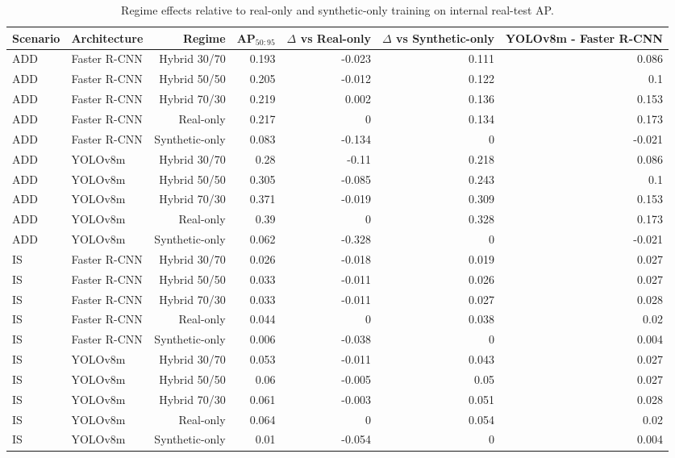 \begin{table}
\caption{Regime effects relative to real-only and synthetic-only training on internal real-test AP.}
\label{tab:effect_deltas}
\begin{tabular}{llrrrrr}
\toprule
Scenario & Architecture & Regime & AP$_{50:95}$ & $\Delta$ vs Real-only & $\Delta$ vs Synthetic-only & YOLOv8m - Faster R-CNN \\
\midrule
ADD & Faster R-CNN & Hybrid 30/70 & 0.193 & -0.023 & 0.111 & 0.086 \\
ADD & Faster R-CNN & Hybrid 50/50 & 0.205 & -0.012 & 0.122 & 0.1 \\
ADD & Faster R-CNN & Hybrid 70/30 & 0.219 & 0.002 & 0.136 & 0.153 \\
ADD & Faster R-CNN & Real-only & 0.217 & 0 & 0.134 & 0.173 \\
ADD & Faster R-CNN & Synthetic-only & 0.083 & -0.134 & 0 & -0.021 \\
ADD & YOLOv8m & Hybrid 30/70 & 0.28 & -0.11 & 0.218 & 0.086 \\
ADD & YOLOv8m & Hybrid 50/50 & 0.305 & -0.085 & 0.243 & 0.1 \\
ADD & YOLOv8m & Hybrid 70/30 & 0.371 & -0.019 & 0.309 & 0.153 \\
ADD & YOLOv8m & Real-only & 0.39 & 0 & 0.328 & 0.173 \\
ADD & YOLOv8m & Synthetic-only & 0.062 & -0.328 & 0 & -0.021 \\
IS & Faster R-CNN & Hybrid 30/70 & 0.026 & -0.018 & 0.019 & 0.027 \\
IS & Faster R-CNN & Hybrid 50/50 & 0.033 & -0.011 & 0.026 & 0.027 \\
IS & Faster R-CNN & Hybrid 70/30 & 0.033 & -0.011 & 0.027 & 0.028 \\
IS & Faster R-CNN & Real-only & 0.044 & 0 & 0.038 & 0.02 \\
IS & Faster R-CNN & Synthetic-only & 0.006 & -0.038 & 0 & 0.004 \\
IS & YOLOv8m & Hybrid 30/70 & 0.053 & -0.011 & 0.043 & 0.027 \\
IS & YOLOv8m & Hybrid 50/50 & 0.06 & -0.005 & 0.05 & 0.027 \\
IS & YOLOv8m & Hybrid 70/30 & 0.061 & -0.003 & 0.051 & 0.028 \\
IS & YOLOv8m & Real-only & 0.064 & 0 & 0.054 & 0.02 \\
IS & YOLOv8m & Synthetic-only & 0.01 & -0.054 & 0 & 0.004 \\
\bottomrule
\end{tabular}
\end{table}
